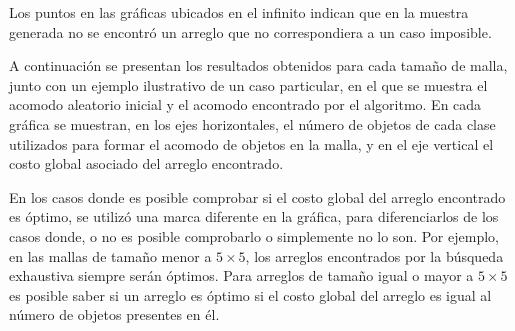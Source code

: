 Los puntos en las gráficas ubicados en el infinito indican que en la muestra generada no se encontró un arreglo que no correspondiera a un caso imposible.

A continuación se presentan los resultados obtenidos para cada tamaño de malla, junto con un ejemplo ilustrativo de un caso particular, en el que se muestra el acomodo aleatorio inicial y el acomodo encontrado por el algoritmo.
En cada gráfica se muestran, en los ejes horizontales, el número de objetos de cada clase utilizados para formar el acomodo de objetos en la malla, y en el eje vertical el costo global asociado del arreglo encontrado.

En los casos donde es posible comprobar si el costo global del arreglo encontrado es óptimo, se utilizó una marca diferente en la gráfica, para diferenciarlos de los casos donde, o no es posible comprobarlo o simplemente no lo son.
Por ejemplo, en las mallas de tamaño menor a $5\times 5$, los arreglos encontrados por la búsqueda exhaustiva siempre serán óptimos.
Para arreglos de tamaño igual o mayor a $5\times 5$ es posible saber si un arreglo es óptimo si el costo global del arreglo es igual al número de objetos presentes en él.

